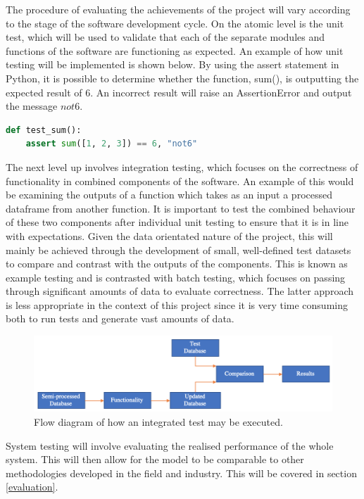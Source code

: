 \documentclass[10pt,onecolumn,letterpaper]{article}
\begin{document}
The procedure of evaluating the achievements of the project will vary according to the stage of the software development cycle. On the atomic level is the unit test, which will be used to validate that each of the separate modules and functions of the software are functioning as expected. An example\cite{python_testing} of how unit testing will be implemented is shown below. By using the assert statement in Python, it is possible to determine whether the function, sum(), is outputting the expected result of $6$. An incorrect result will raise an AssertionError and output the message $not6$.

\begin{lstlisting}[language=Python, caption=Example Test.]
def test_sum():
    assert sum([1, 2, 3]) == 6, "not6"
\end{lstlisting} 

The next level up involves integration testing, which focuses on the correctness of functionality in combined components of the software. An example of this would be examining the outputs of a function which takes as an input a processed dataframe from another function. It is important to test the combined behaviour of these two components after individual unit testing to ensure that it is in line with expectations. Given the data orientated nature of the project, this will mainly be achieved through the development of small, well-defined test datasets to compare and contrast with the outputs of the components. This is known as example testing and is contrasted with batch testing, which focuses on passing through significant amounts of data to evaluate correctness. The latter approach is less appropriate in the context of this project since it is very time consuming both to run tests and generate vast amounts of data.

\begin{figure}[!hbt!]
\centering
\includegraphics[width=16.5cm]{integrated_testing.png}
\caption{Flow diagram of how an integrated test may be executed.}
\end{figure}

System testing will involve evaluating the realised performance of the whole system. This will then allow for the model to be comparable to other methodologies developed in the field and industry. This will be covered in section \ref{evaluation}.
\end{document}
